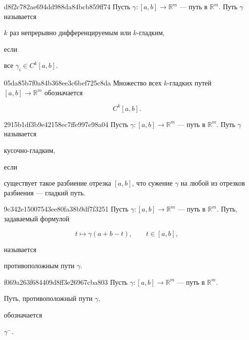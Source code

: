 \begin{note}{d8f2c782ae694dd988da84bcb859ff74}
    Пусть \({ \gamma : [a, b] \to \mathbb R^{m} }\) --- путь в \({ \mathbb R^{m} }\).
    Путь \({ \gamma }\) называется \begin{icloze}{2}\({ k }\) раз непрерывно дифференцируемым или \({ k }\)-гладким,\end{icloze} если \begin{icloze}{1}все \({ \gamma_i \in C^{k}[a, b] }\).\end{icloze}
\end{note}

\begin{note}{05da85b7f0a84b368ee3c6bef725c8da}
    Множество всех \({ k }\)-гладких путей \({ [a, b] \to \mathbb R^{m} }\) обозначается
    \begin{icloze}{1}
        \[
            C^{k}[a, b].
        \]
    \end{icloze}
\end{note}

\begin{note}{2915b1df3b9e42158ec7ffe997e98a04}
    Пусть \({ \gamma : [a, b] \to \mathbb R^{m} }\) --- путь в \({ \mathbb R^{m} }\).
    Путь \({ \gamma }\) называется \begin{icloze}{2}ку\-соч\-но-гладким,\end{icloze} если \begin{icloze}{1}существует такое разбиение отрезка \({ [a, b] }\), что
    сужение \({ \gamma }\) на любой из отрезков разбиения --- гладкий путь.\end{icloze}
\end{note}

\begin{note}{9c342e15007543ee80fa38b9df7f3251}
    Пусть \({ \gamma : [a, b] \to \mathbb R^{m} }\) --- путь в \({ \mathbb R^{m} }\).
    Путь, задаваемый формулой
    \begin{icloze}{1}
        \[
            t \mapsto \gamma(a + b - t), \qquad t \in [a, b],
        \]
    \end{icloze}
    называется \begin{icloze}{2}противоположным пути \({ \gamma }\).\end{icloze}
\end{note}

\begin{note}{f069a263f684409d8ff3e26967cba803}
    Пусть \({ \gamma : [a, b] \to \mathbb R^{m} }\) --- путь в \({ \mathbb R^{m} }\).
    \begin{icloze}{2}Путь, противоположный пути \({ \gamma }\),\end{icloze} обозначается \begin{icloze}{1}\({ \gamma^{-} }\).\end{icloze}
\end{note}

